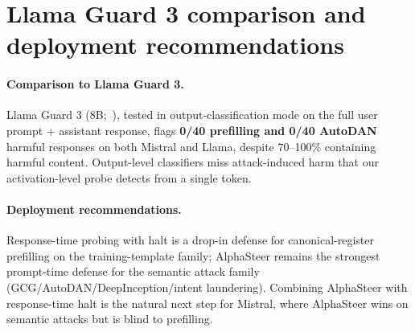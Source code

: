 \documentclass{article}
\begin{document}
\section{Llama Guard 3 comparison and deployment recommendations}
\label{app:llamaguard}

\paragraph{Comparison to Llama Guard 3.}
Llama Guard 3 (8B;~\citet{llamaguard2024}), tested in output-classification mode on the full user prompt + assistant response, flags \textbf{0/40 prefilling and 0/40 AutoDAN} harmful responses on both Mistral and Llama, despite 70--100\% containing harmful content. Output-level classifiers miss attack-induced harm that our activation-level probe detects from a single token.

\paragraph{Deployment recommendations.}
Response-time probing with halt is a drop-in defense for canonical-register prefilling on the training-template family; AlphaSteer remains the strongest prompt-time defense for the semantic attack family (GCG/AutoDAN/DeepInception/intent laundering). Combining AlphaSteer with response-time halt is the natural next step for Mistral, where AlphaSteer wins on semantic attacks but is blind to prefilling.
\end{document}
